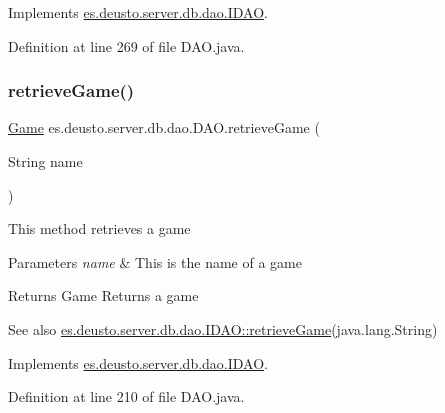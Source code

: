 Implements \hyperlink{interfacees_1_1deusto_1_1server_1_1db_1_1dao_1_1_i_d_a_o_ad6fd7873e2191e887184e2261e34e3e5}{es.\+deusto.\+server.\+db.\+dao.\+I\+D\+AO}.



Definition at line 269 of file D\+A\+O.\+java.

\mbox{\label{classes_1_1deusto_1_1server_1_1db_1_1dao_1_1_d_a_o_ac94a91d3e5aeeb98fc12f087532b3506}} 
\subsubsection{\texorpdfstring{retrieve\+Game()}{retrieveGame()}}
{\footnotesize\ttfamily \hyperlink{classes_1_1deusto_1_1server_1_1db_1_1data_1_1_game}{Game} es.\+deusto.\+server.\+db.\+dao.\+D\+A\+O.\+retrieve\+Game (\begin{DoxyParamCaption}\item[{String}]{name }\end{DoxyParamCaption})}

This method retrieves a game 
\begin{DoxyParams}{Parameters}
{\em name} & This is the name of a game \\
\hline
\end{DoxyParams}
\begin{DoxyReturn}{Returns}
Game Returns a game 
\end{DoxyReturn}
\begin{DoxySeeAlso}{See also}
\hyperlink{interfacees_1_1deusto_1_1server_1_1db_1_1dao_1_1_i_d_a_o_a30558c19c086ac0ffff6796a8ae208fb}{es.\+deusto.\+server.\+db.\+dao.\+I\+D\+A\+O\+::retrieve\+Game}(java.\+lang.\+String) 
\end{DoxySeeAlso}


Implements \hyperlink{interfacees_1_1deusto_1_1server_1_1db_1_1dao_1_1_i_d_a_o_a30558c19c086ac0ffff6796a8ae208fb}{es.\+deusto.\+server.\+db.\+dao.\+I\+D\+AO}.



Definition at line 210 of file D\+A\+O.\+java.

\mbox{\label{classes_1_1deusto_1_1server_1_1db_1_1dao_1_1_d_a_o_a16b0af798fbb00cd29a505491c57e2cd}} 

